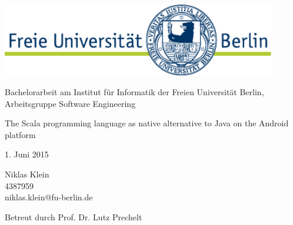 \begin{titlepage}
\begin{center}

	\includegraphics[width=12cm]{asset/fu-logo.pdf}

	\vspace{1.5cm}

	Bachelorarbeit am Institut für Informatik der Freien Universität Berlin, Arbeitsgruppe Software Engineering

	\vspace{2.5cm}

	\begin{spacing}{1.3}
	\begin{huge}

		The Scala programming language as native alternative to Java on the Android platform

	\end{huge}
	\end{spacing}

	\vspace{1.5cm}

	1. Juni 2015

	\vspace{\fill}

	Niklas Klein\\
	4387959\\
	niklas.klein@fu-berlin.de

	\vspace{0.7cm}

	Betreut durch Prof. Dr. Lutz Prechelt

\end{center}
\end{titlepage}